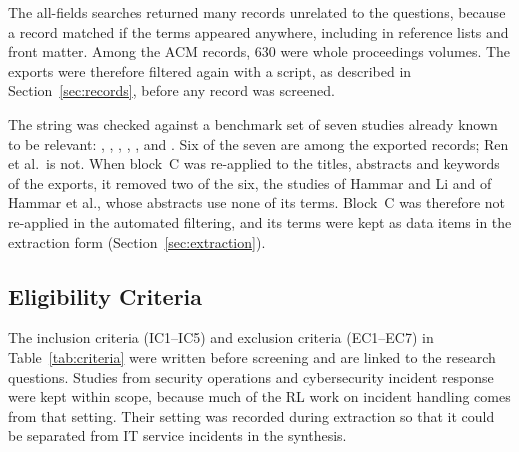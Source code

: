 \documentclass[pdflatex,sn-basic]{sn-jnl}
\begin{document}
The all-fields searches returned many records unrelated to the questions, because a record matched if the terms appeared anywhere, including in reference lists and front matter. Among the ACM records, 630 were whole proceedings volumes. The exports were therefore filtered again with a script, as described in Section~\ref{sec:records}, before any record was screened.

The string was checked against a benchmark set of seven studies already known to be relevant: \citet{alauthman2026}, \citet{hammar2025}, \citet{hammar2026belief}, \citet{wang2023hrlhf}, \citet{ding2023}, \citet{ren2025} and \citet{dunsin2025}. Six of the seven are among the exported records; Ren et al.\ is not. When block~C was re-applied to the titles, abstracts and keywords of the exports, it removed two of the six, the studies of Hammar and Li and of Hammar et al., whose abstracts use none of its terms. Block~C was therefore not re-applied in the automated filtering, and its terms were kept as data items in the extraction form (Section~\ref{sec:extraction}).

\subsection{Eligibility Criteria}

The inclusion criteria (IC1--IC5) and exclusion criteria (EC1--EC7) in Table~\ref{tab:criteria} were written before screening and are linked to the research questions. Studies from security operations and cybersecurity incident response were kept within scope, because much of the RL work on incident handling comes from that setting. Their setting was recorded during extraction so that it could be separated from IT service incidents in the synthesis.
\end{document}
